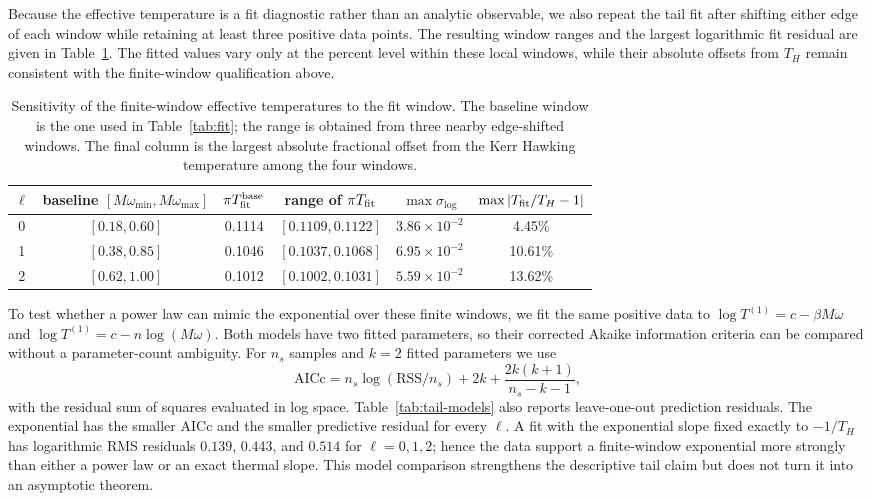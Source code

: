 \documentclass[aps,prd,twocolumn,10pt,nofootinbib,superscriptaddress,floatfix]{revtex4-2}
\begin{document}
Because the effective temperature is a fit diagnostic rather than an analytic
observable, we also repeat the tail fit after shifting either edge of each
window while retaining at least three positive data points.  The resulting
window ranges and the largest logarithmic fit residual are given in
Table~\ref{tab:tail-window}.  The fitted values vary only at the percent level
within these local windows, while their absolute offsets from $T_H$ remain
consistent with the finite-window qualification above.

\begin{table}[t]
\caption{Sensitivity of the finite-window effective temperatures to the fit
window.  The baseline window is the one used in Table~\ref{tab:fit}; the range
is obtained from three nearby edge-shifted windows.  The final column is the
largest absolute fractional offset from the Kerr Hawking temperature among
the four windows.}
\label{tab:tail-window}
\begin{ruledtabular}
\begin{tabular}{c c c c c c}
$\ell$ & baseline $[M\omega_{\min},M\omega_{\max}]$
& $\pi T_{\rm fit}^{\rm base}$ & range of $\pi T_{\rm fit}$
& $\max\sigma_{\log}$ & $\max|T_{\rm fit}/T_H-1|$\\
\hline
0 & $[0.18,0.60]$ & 0.1114 & $[0.1109,0.1122]$ & $3.86\times10^{-2}$ & 4.45\%\\
1 & $[0.38,0.85]$ & 0.1046 & $[0.1037,0.1068]$ & $6.95\times10^{-2}$ & 10.61\%\\
2 & $[0.62,1.00]$ & 0.1012 & $[0.1002,0.1031]$ & $5.59\times10^{-2}$ & 13.62\%\\
\end{tabular}
\end{ruledtabular}
\end{table}

To test whether a power law can mimic the exponential over these finite
windows, we fit the same positive data to
$\log T^{(1)}=c-\beta M\omega$ and
$\log T^{(1)}=c-n\log(M\omega)$.  Both models have two fitted parameters, so
their corrected Akaike information criteria can be compared without a
parameter-count ambiguity.  For $n_s$ samples and $k=2$ fitted parameters we
use
\begin{equation}
\mathrm{AICc}=n_s\log(\mathrm{RSS}/n_s)+2k
+\frac{2k(k+1)}{n_s-k-1},
\label{eq:aicc}
\end{equation}
with the residual sum of squares evaluated in log space.
Table~\ref{tab:tail-models} also reports
leave-one-out prediction residuals.  The exponential has the smaller AICc and
the smaller predictive residual for every $\ell$.  A fit with the exponential
slope fixed exactly to $-1/T_H$ has logarithmic RMS residuals $0.139$, $0.443$,
and $0.514$ for $\ell=0,1,2$; hence the data support a finite-window
exponential more strongly than either a power law or an exact thermal slope.
This model comparison strengthens the descriptive tail claim but does not
turn it into an asymptotic theorem.
\end{document}
